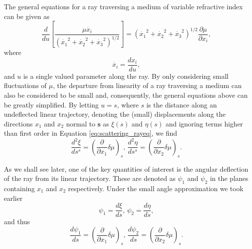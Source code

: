 The general equations for a ray traversing a medium of variable refractive index can be given as 
\begin{equation}
\label{eq:scattering_rayeq}
\frac{d}{du}\left[\frac{\mu \dot{x_i}}{(\dot{x_1}^2 + \dot{x_2}^2 + \dot{x_3}^2 )^{1/2}} \right] = (\dot{x_1}^2 + \dot{x_2}^2 + \dot{x_3}^2 )^{1/2} \frac{\partial \mu}{\partial x_i} ,
\end{equation}
where 
\begin{equation}
\dot{x_i} = \frac{dx_i}{du},
\end{equation}
and $u$ is a single valued parameter along the ray. By only considering small fluctuations of $\mu$, the departure from linearity of a ray traversing  a medium can also be considered to be small and, consequently, the general equations above can be greatly simplified. By letting $u=s$, where $s$ is the distance along an undeflected linear trajectory, denoting the (small) displacements along the directions $x_1$ and $x_2$ normal to $\mathbf{s}$ as $\xi (s)$ and $\eta (s)$ and ignoring terms higher than first order in Equation \ref{eq:scattering_rayeq}, we find
\begin{equation}
\label{eq:scattering_displacement}
\frac{d^2 \xi}{ds^s} = \left( \frac{\partial}{\partial x_1	} \delta \mu \right)_s \mbox{, } \frac{d^2 \eta}{ds^s} = \left( \frac{\partial}{\partial x_2} \delta \mu \right)_s.
\end{equation}

As we shall see later, one of the key quantities of interest is the angular deflection of the ray from its linear trajectory. These are denoted as $\psi_1$ and $\psi_2$ in the planes containing $x_1$ and $x_2$ respectively. Under the small angle approximation we took earlier
\begin{equation}
\label{eq_scattering_smallangle}
\psi_1 = \frac{d \xi}{ds} \mbox{, } \psi_2 = \frac{d \eta}{ds},
\end{equation}
and thus
\begin{equation}
\label{eq:scattering_angulardisplacement}
\frac{d \psi_1}{ds} =  \left( \frac{\partial}{\partial x_1} \delta \mu \right)_s \mbox{, } \frac{d \psi_2}{ds} = \left( \frac{\partial}{\partial x_2} \delta \mu \right)_s.
\end{equation}

